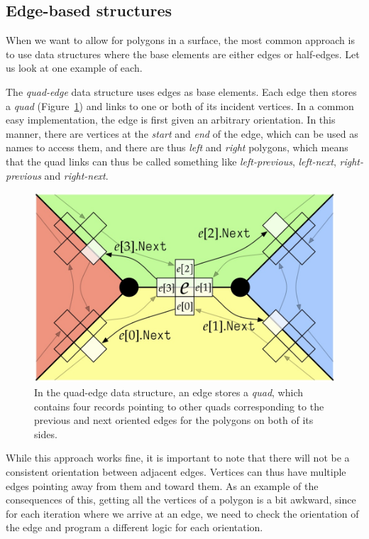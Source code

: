 \subsection{Edge-based structures}

When we want to allow for polygons in a surface, the most common approach is to use data structures where the base elements are either edges or half-edges.
Let us look at one example of each.

The \emph{quad-edge} data structure uses edges as base elements.
Each edge then stores a \emph{quad} (Figure~\ref{fig:quad}) and links to one or both of its incident vertices.
In a common easy implementation, the edge is first given an arbitrary orientation.
In this manner, there are vertices at the \emph{start} and \emph{end} of the edge, which can be used as names to access them, and there are thus \emph{left} and \emph{right} polygons, which means that the quad links can thus be called something like \emph{left-previous}, \emph{left-next}, \emph{right-previous} and \emph{right-next}.

\begin{figure}[b]
\centering
\includegraphics[width=0.7\linewidth]{figs/quad}
\caption{In the quad-edge data structure, an edge stores a \emph{quad}, which contains four records pointing to other quads corresponding to the previous and next oriented edges for the polygons on both of its sides.}%
\label{fig:quad}
\end{figure}

While this approach works fine, it is important to note that there will not be a consistent orientation between adjacent edges.
Vertices can thus have multiple edges pointing away from them and toward them.
As an example of the consequences of this, getting all the vertices of a polygon is a bit awkward, since for each iteration where we arrive at an edge, we need to check the orientation of the edge and program a different logic for each orientation.

